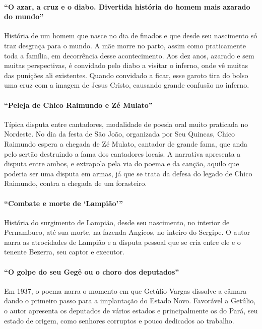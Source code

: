 \paragraph{``O azar, a cruz e o diabo. Divertida história do homem
mais azarado do mundo''}

História de um homem que nasce no dia de finados e que desde seu
nascimento só traz desgraça para o mundo. A mãe morre no parto, assim
como praticamente toda a família, em decorrência desse acontecimento.
Aos dez anos, azarado e sem muitas perspectivas, é convidado pelo diabo
a visitar o inferno, onde vê muitas das punições ali existentes. Quando
convidado a ficar, esse garoto tira do bolso uma cruz com a imagem de
Jesus Cristo, causando grande confusão no inferno.

\paragraph{``Peleja de Chico Raimundo e Zé Mulato''}

Típica disputa entre cantadores, modalidade de 
poesia oral muito praticada no Nordeste. No dia da
festa de São João, organizada por Seu Quincas, Chico Raimundo espera a
chegada de Zé Mulato, cantador de grande fama, que anda pelo sertão
destruindo a fama dos cantadores locais. A narrativa apresenta a
disputa entre ambos, e extrapola pela via do poema e da canção, aquilo
que poderia ser uma disputa em armas, já que se trata da defesa do
legado de Chico Raimundo, contra a chegada de um forasteiro.


\paragraph{``Combate e morte de `Lampião'''}

História do surgimento de Lampião, desde seu nascimento, no interior de
Pernambuco, até sua morte, na fazenda Angicos, no inteiro do Sergipe. O
autor narra as atrocidades de Lampião e a disputa pessoal que se cria
entre ele e o tenente Bezerra, seu captor e executor.

\paragraph{``O golpe do seu Gegê ou o choro dos deputados''}

Em 1937, o poema narra o momento em que Getúlio Vargas dissolve a câmara
dando o primeiro passo para a implantação do Estado Novo. Favorável a
Getúlio, o autor apresenta os deputados de vários estados e
principalmente os do Pará, seu estado de origem, como senhores
corruptos e pouco dedicados ao trabalho.

